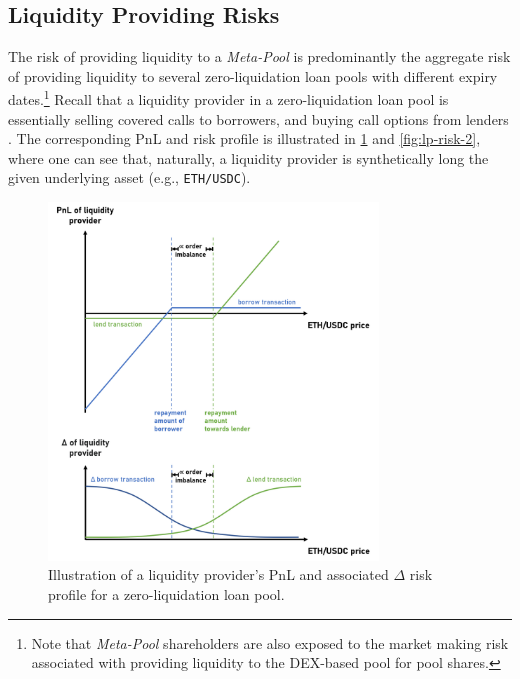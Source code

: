 \documentclass[a4paper]{article}
\begin{document}
\subsection{Liquidity Providing Risks}
\label{sec:hedging}
The risk of providing liquidity to a \emph{Meta-Pool} is predominantly the aggregate risk of providing liquidity to several zero-liquidation loan pools with different expiry dates.\footnote{Note that \emph{Meta-Pool} shareholders are also exposed to the market making risk associated with providing liquidity to the DEX-based pool for pool shares.} Recall that a liquidity provider in a zero-liquidation loan pool is essentially selling covered calls to borrowers, and buying call options from lenders \cite{sardon}. The corresponding PnL and risk profile is illustrated in \cref{fig:lp-risk-1} and \cref{fig:lp-risk-2}, where one can see that, naturally, a liquidity provider is synthetically long the given underlying asset (e.g., \verb|ETH/USDC|).\\


\begin{figure}
    \centering
    \includegraphics[width=0.78\textwidth]{figures/lp-risk-1.png} 
    \cprotect\caption{\small Illustration of a liquidity provider's PnL and associated $\Delta$ risk profile for a zero-liquidation loan pool.}
    \label{fig:lp-risk-1}
\end{figure}
\end{document}
